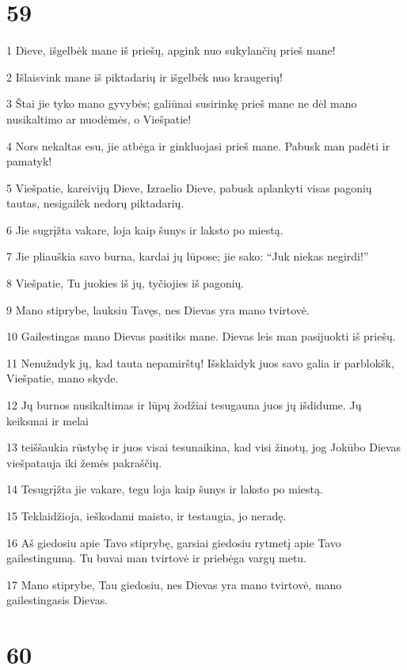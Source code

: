 \chapter{59}


\par 1 Dieve, išgelbėk mane iš priešų, apgink nuo sukylančių prieš mane! 
\par 2 Išlaisvink mane iš piktadarių ir išgelbėk nuo kraugerių! 
\par 3 Štai jie tyko mano gyvybės; galiūnai susirinkę prieš mane ne dėl mano nusikaltimo ar nuodėmės, o Viešpatie! 
\par 4 Nors nekaltas esu, jie atbėga ir ginkluojasi prieš mane. Pabusk man padėti ir pamatyk! 
\par 5 Viešpatie, kareivijų Dieve, Izraelio Dieve, pabusk aplankyti visas pagonių tautas, nesigailėk nedorų piktadarių. 
\par 6 Jie sugrįžta vakare, loja kaip šunys ir laksto po miestą. 
\par 7 Jie pliauškia savo burna, kardai jų lūpose; jie sako: “Juk niekas negirdi!” 
\par 8 Viešpatie, Tu juokies iš jų, tyčiojies iš pagonių. 
\par 9 Mano stiprybe, lauksiu Tavęs, nes Dievas yra mano tvirtovė. 
\par 10 Gailestingas mano Dievas pasitiks mane. Dievas leis man pasijuokti iš priešų. 
\par 11 Nenužudyk jų, kad tauta nepamirštų! Išsklaidyk juos savo galia ir parblokšk, Viešpatie, mano skyde. 
\par 12 Jų burnos nusikaltimas ir lūpų žodžiai tesugauna juos jų išdidume. Jų keiksmai ir melai 
\par 13 teiššaukia rūstybę ir juos visai tesunaikina, kad visi žinotų, jog Jokūbo Dievas viešpatauja iki žemės pakraščių. 
\par 14 Tesugrįžta jie vakare, tegu loja kaip šunys ir laksto po miestą. 
\par 15 Teklaidžioja, ieškodami maisto, ir testaugia, jo neradę. 
\par 16 Aš giedosiu apie Tavo stiprybę, garsiai giedosiu rytmetį apie Tavo gailestingumą. Tu buvai man tvirtovė ir priebėga vargų metu. 
\par 17 Mano stiprybe, Tau giedosiu, nes Dievas yra mano tvirtovė, mano gailestingasis Dievas.



\chapter{60}


